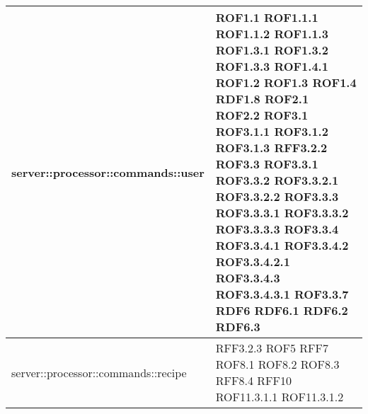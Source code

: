 \begin{center}
\begin{longtable}{| p{9cm} | p{4cm} |}
server::processor::commands::user  &  ROF1.1 \newline ROF1.1.1 \newline ROF1.1.2 \newline ROF1.1.3 \newline ROF1.3.1 \newline ROF1.3.2 \newline ROF1.3.3 \newline ROF1.4.1 \newline ROF1.2 \newline ROF1.3 \newline ROF1.4 \newline RDF1.8 \newline ROF2.1 \newline ROF2.2 \newline ROF3.1 \newline ROF3.1.1 \newline ROF3.1.2 \newline ROF3.1.3 \newline RFF3.2.2 \newline ROF3.3 \newline ROF3.3.1 \newline ROF3.3.2 \newline ROF3.3.2.1 \newline ROF3.3.2.2 \newline ROF3.3.3 \newline ROF3.3.3.1 \newline ROF3.3.3.2 \newline ROF3.3.3.3 \newline ROF3.3.4 \newline ROF3.3.4.1 \newline ROF3.3.4.2 \newline ROF3.3.4.2.1 \newline ROF3.3.4.3 \newline ROF3.3.4.3.1 \newline ROF3.3.7 \newline RDF6 \newline RDF6.1 \newline RDF6.2 \newline RDF6.3 \newline \\
\hline
server::processor::commands::recipe  &  RFF3.2.3 \newline ROF5 \newline RFF7 \newline ROF8.1 \newline ROF8.2 \newline ROF8.3 \newline RFF8.4 \newline RFF10 \newline ROF11.3.1.1 \newline ROF11.3.1.2 \newline \\

\end{longtable}
\end{center}

